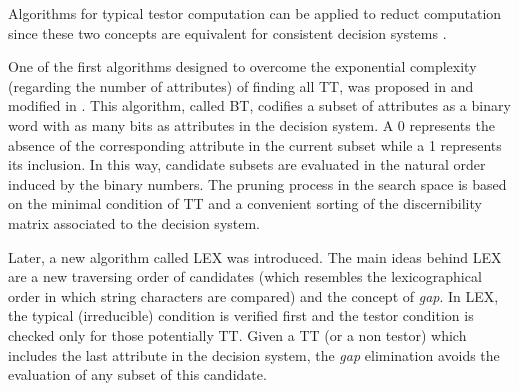 \documentclass[number,preprint,review,12pt]{elsarticle}
\begin{document}
  Algorithms for typical testor computation can be applied to reduct computation since these two concepts are equivalent for consistent decision systems \citep{Lazo15}.
  
  One of the first algorithms designed to overcome the exponential complexity (regarding the number of attributes) of finding all TT, was proposed in \cite{Ruiz85} and modified in \cite{sanchez02}. This algorithm, called BT, codifies a subset of attributes as a binary word with as many bits as attributes in the decision system. A 0 represents the absence of the corresponding attribute in the current subset while a 1 represents its inclusion. In this way, candidate subsets are evaluated in the natural order induced by the binary numbers. The pruning process in the search space is based on the minimal condition of TT and a convenient sorting of the discernibility matrix associated to the decision system. 
  
  
  Later, a new algorithm called LEX \cite{Santiesteban03} was introduced. The main ideas behind LEX are a new traversing order of candidates (which resembles the lexicographical order in which string characters are compared) and the concept of \emph{gap}. In LEX, the typical (irreducible) condition is verified first and the testor condition is checked only for those potentially TT. Given a TT (or a non testor) which includes the last attribute in the decision system, the \emph{gap} elimination avoids the evaluation of any subset of this candidate. 
  
\end{document}
